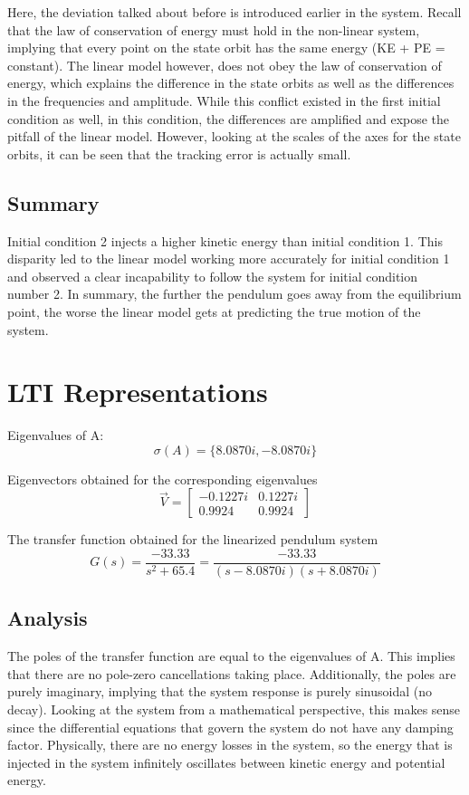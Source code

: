 \documentclass[10pt]{article}
\begin{document}
Here, the deviation talked about before is introduced earlier in the system. Recall that the law of conservation of energy must hold in the non-linear system, implying that every point on the state orbit has the same energy (KE + PE = constant). The linear model however, does not obey the law of conservation of energy, which explains the difference in the state orbits as well as the differences in the frequencies and amplitude. While this conflict existed in the first initial condition as well, in this condition, the differences are amplified and expose the pitfall of the linear model. However, looking at the scales of the axes for the state orbits, it can be seen that the tracking error is actually small. 

\subsection{Summary}
Initial condition 2 injects a higher kinetic energy than initial condition 1. This disparity led to the linear model working more accurately for initial condition 1 and observed a clear incapability to follow the system for initial condition number 2. In summary, the further the pendulum goes away from the equilibrium point, the worse the linear model gets at predicting the true motion of the system.

\section{LTI Representations}
Eigenvalues of A:
\begin{equation*}
    \sigma(A) = \{8.0870i, -8.0870i\}
\end{equation*}

Eigenvectors obtained for the corresponding eigenvalues
\begin{equation*}
    \vec{V} = \begin{bmatrix}
    -0.1227i & 0.1227i\\ 0.9924 & 0.9924 
    \end{bmatrix}
\end{equation*}

The transfer function obtained for the linearized pendulum system
\begin{equation*}
G(s) = \frac{-33.33}{s^2+65.4} = \frac{-33.33}{(s-8.0870i)(s+8.0870i)} 
\end{equation*}

\subsection{Analysis}
The poles of the transfer function are equal to the eigenvalues of A. This implies that there are no pole-zero cancellations taking place. Additionally, the poles are purely imaginary, implying that the system response is purely sinusoidal (no decay). Looking at the system from a mathematical perspective, this makes sense since the differential equations that govern the system do not have any damping factor. Physically, there are no energy losses in the system, so the energy that is injected in the system infinitely oscillates between kinetic energy and potential energy. 
\end{document}
